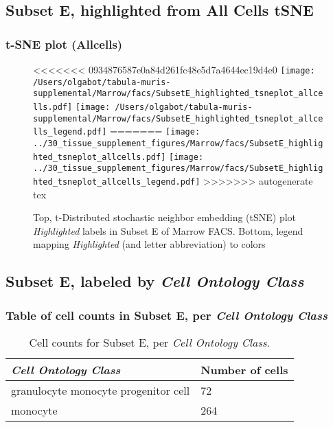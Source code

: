 \clearpage
\subsection{Subset E, highlighted from All Cells tSNE}
\subsubsection{t-SNE plot (Allcells)}
\begin{figure}[h]
\centering
<<<<<<< 0934876587e0a84d261fc48e5d7a4644ec19d4e0
\texttt{[image: /Users/olgabot/tabula-muris-supplemental/Marrow/facs/SubsetE\_highlighted\_tsneplot\_allcells.pdf]}
\texttt{[image: /Users/olgabot/tabula-muris-supplemental/Marrow/facs/SubsetE\_highlighted\_tsneplot\_allcells\_legend.pdf]}
=======
\texttt{[image: ../30\_tissue\_supplement\_figures/Marrow/facs/SubsetE\_highlighted\_tsneplot\_allcells.pdf]}
\texttt{[image: ../30\_tissue\_supplement\_figures/Marrow/facs/SubsetE\_highlighted\_tsneplot\_allcells\_legend.pdf]}
>>>>>>> autogenerate tex
\caption{Top, t-Distributed stochastic neighbor embedding (tSNE) plot  \emph{Highlighted} labels in Subset E of Marrow FACS. Bottom, legend mapping \emph{Highlighted} (and letter abbreviation) to colors}
\end{figure}


\clearpage

\subsection{Subset E, labeled by \emph{Cell Ontology Class}}
\subsubsection{Table of cell counts in Subset E, per \emph{Cell Ontology Class}}\begin{table}[h]
\centering
\label{my-label}
\begin{tabular}{@{}ll@{}}
\toprule

\emph{Cell Ontology Class}& Number of cells \\ \midrule
granulocyte monocyte progenitor cell & 72 \\

monocyte & 264 \\
\bottomrule
\end{tabular}
\caption{Cell counts for Subset E, per \emph{Cell Ontology Class}.}
\end{table}

